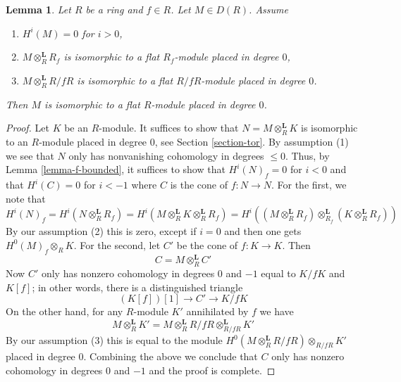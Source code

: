 \documentclass[10pt,a4paper]{amsart}
\theoremstyle{plain}
\newtheorem{lemma}[subsection]{Lemma}
\theoremstyle{definition}
\theoremstyle{remark}
\numberwithin{equation}{subsection}
\begin{document}
\begin{lemma}
\label{lemma-f-flat}
Let $R$ be a ring and $f \in R$. Let $M \in D(R)$. Assume
\begin{enumerate}
\item $H^i(M) = 0$ for $i > 0$,
\item $M \otimes_R^\mathbf{L} R_f$ is isomorphic to a flat $R_f$-module
placed in degree $0$,
\item $M \otimes_R^\mathbf{L} R/fR$ is isomorphic to a flat $R/fR$-module
placed in degree $0$.
\end{enumerate}
Then $M$ is isomorphic to a flat $R$-module placed in degree $0$.
\end{lemma}

\begin{proof}
Let $K$ be an $R$-module. It suffices to show that
$N = M \otimes_R^\mathbf{L} K$ is isomorphic to an
$R$-module placed in degree $0$, see Section \ref{section-tor}.
By assumption (1) we see that $N$ only has nonvanishing
cohomology in degrees $\leq 0$. Thus, by Lemma \ref{lemma-f-bounded},
it suffices to show that $H^i(N)_f = 0$ for $i < 0$ and
that $H^i(C) = 0$ for $i < -1$ where $C$ is the cone
of $f : N \to N$. For the first, we note that
$$
H^i(N)_f = H^i(N \otimes_R^\mathbf{L} R_f) =
H^i(M \otimes_R^\mathbf{L} K \otimes_R^\mathbf{L} R_f ) =
H^i((M \otimes_R^\mathbf{L} R_f) \otimes_{R_f}^\mathbf{L}
(K \otimes_R^\mathbf{L} R_f))
$$
By our assumption (2) this is zero, except if $i = 0$ and then one gets
$H^0(M)_f \otimes_R K$. For the second, let $C'$ be the cone of $f : K \to K$.
Then
$$
C = M \otimes_R^\mathbf{L} C'
$$
Now $C'$ only has nonzero cohomology in degrees $0$ and $-1$ equal to
$K/fK$ and $K[f]$; in other words, there is a distinguished triangle
$$
(K[f])[1] \to C' \to K/fK
$$
On the other hand, for any $R$-module $K'$ annihilated by $f$ we have
$$
M \otimes_R^\mathbf{L} K' =
M \otimes_R^\mathbf{L} R/fR \otimes_{R/fR}^\mathbf{L} K'
$$
By our assumption (3) this is equal to the module
$H^0(M \otimes_R^\mathbf{L} R/fR) \otimes_{R/fR} K'$ placed in degree $0$.
Combining the above we conclude that $C$ only has nonzero
cohomology in degrees $0$ and $-1$ and the proof is complete.
\end{proof}
\end{document}
